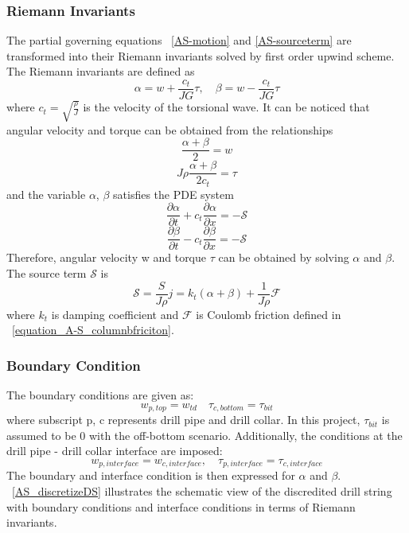 \subsubsection{Riemann Invariants}
The partial governing equations \equationname~\ref{AS-motion} and \ref{AS-sourceterm} are transformed into their Riemann invariants solved by first order upwind scheme. The Riemann invariants are defined as
\begin{equation}\label{AS-Riemann}
  \alpha = w + \frac{c_t}{JG}\tau, \quad \beta=w-\frac{c_t}{JG}\tau
\end{equation}
where $c_t = \sqrt{\frac{\rho}{J}}$ is the velocity of the torsional wave. It can be noticed that angular velocity and torque can be obtained from the relationships
\begin{equation}\label{equation_Riemann_relation1}
  \frac{\alpha + \beta}{2} = w
\end{equation}
\begin{equation}\label{equation_Riemann_relation2}
  J \rho \frac{\alpha + \beta}{2c_t} = \tau
\end{equation}
and the variable $\alpha$, $\beta$ satisfies the PDE system 
\begin{equation}\label{AS-Riemann_alpha}
  \frac{\partial \alpha}{\partial t} + c_t\frac{\partial \alpha}{\partial x} = -\mathcal{S}
\end{equation}
\begin{equation}\label{AS-Riemann_beta}
  \frac{\partial \beta}{\partial t} - c_t\frac{\partial \beta}{\partial x} = -\mathcal{S}
\end{equation}
Therefore, angular velocity w and torque $\tau$ can be obtained by solving $\alpha$ and $\beta$.
The source term $\mathcal{S}$ is
\begin{equation}\label{AS-source}
  \mathcal{S} = \frac{S}{J \rho} j= k_t(\alpha + \beta) + \frac{1}{J \rho} \mathcal{F}
\end{equation}
where $k_t$ is damping coefficient and $\mathcal{F}$ is Coulomb friction defined in \equationname~\ref{equation_A-S_columnbfriciton}. 
\subsubsection{Boundary Condition}
The boundary conditions are given as:
\begin{equation}\label{AS-BC}
  w_{p,top} = w_{td} \quad \tau_{c,bottom} = \tau_{bit}
\end{equation}
where subscript p, c represents drill pipe and drill collar. In this project, $\tau_{bit}$ is assumed to be 0 with the off-bottom scenario. 
Additionally, the conditions at the drill pipe - drill collar interface are imposed:
\begin{equation}\label{AS-interface}
  w_{p,interface} = w_{c,interface}, \quad \tau_{p,interface} = \tau_{c,interface}
\end{equation}
The boundary and interface condition is then expressed for $\alpha$ and $\beta$. \figurename~\ref{AS_discretizeDS} illustrates the schematic view of the discredited drill string with boundary conditions and interface conditions in terms of Riemann invariants.

